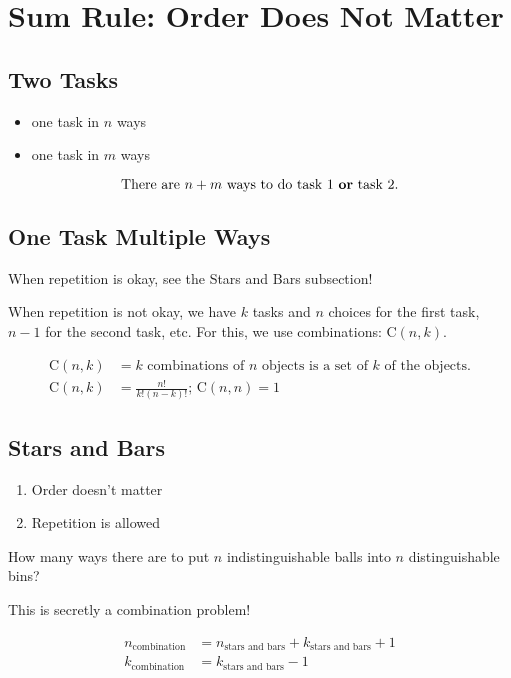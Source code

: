 \documentclass{report}
\begin{document}
\section{Sum Rule: Order Does Not Matter}

\subsection{Two Tasks}
\begin{itemize}
    \item one task in $n$ ways
    \item one task in $m$ ways
\end{itemize}

\begin{equation}
    \text{There are } n + m \text{ ways to do task 1 \textbf{or} task 2.}
\end{equation}

\subsection{One Task Multiple Ways}
When repetition is okay, see the Stars and Bars subsection!

When repetition is not okay, we have $k$ tasks and $n$ choices for the first task, $n-1$ for the second task, etc. For this, we use combinations: $\text{C}(n, k)$.

\begin{align}
    \text{$\text{C}(n, k)$} &= \text{$k$ combinations of $n$ objects is a set of $k$ of the objects.} \\
    \text{C}(n, k) &= \frac{n!}{k!(n-k)!} \text{; } \text{C}(n, n) = 1
\end{align}

\subsection{Stars and Bars}

\begin{enumerate}
    \item Order doesn't matter
    \item Repetition is allowed
\end{enumerate}

How many ways there are to put $n$ indistinguishable balls into $n$ distinguishable bins?

This is secretly a combination problem! 

\begin{align}
    n_{\text{combination}} &= n_{\text{stars and bars}} + k_{\text{stars and bars}} + 1 \\
    k_{\text{combination}} &= k_{\text{stars and bars}} -1
\end{align}
\end{document}
